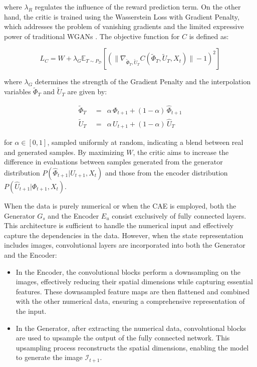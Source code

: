 where \( \lambda_R \) regulates the influence of the reward
prediction term. On the other hand, the critic is trained
using the Wasserstein Loss with Gradient Penalty,
which addresses the problem of vanishing gradients and
the limited expressive power of traditional WGANs \cite{gulrajani2017}.
The objective function for \( C \) is defined as:

\begin{equation}
L_C = W + \lambda_G \mathbb{E}_{T \sim P_{\mathcal{D}}}
\left[ (\| \nabla_{\tilde{\Phi}_T, \tilde{U}_T} C(\tilde{\Phi}_T,
\tilde{U}_T, X_t) \| - 1)^2 \right]
\end{equation}

where \( \lambda_G \) determines the strength of the Gradient Penalty
and the interpolation variables \( \tilde{\Phi}_T \) and \( \tilde{U}_T \)
are given by:

\[
    \begin{aligned}
        \tilde{\Phi}_T \;\; &=& \alpha \, \Phi_{t+1} + (1 - \alpha) \, \hat{\Phi}_{t+1} \\ 
        \tilde{U}_T \;\; &=& \alpha \, U_{t+1} + (1 - \alpha) \, \hat{U}_T
    \end{aligned}
\]

for \( \alpha \in [0, 1] \), sampled uniformly at random,
indicating a blend between real and generated samples.
By maximizing \( W \), the critic aims to increase the difference
in evaluations between samples generated from the generator distribution
\( P(\hat{\Phi}_{t+1} | U_{t+1}, X_t) \) and those from the encoder
distribution \( P(\hat{U}_{t+1} | \Phi_{t+1}, X_t) \).

When the data is purely numerical or when the
CAE is employed, both the Generator $G_s$ and the
Encoder $E_u$ consist exclusively of fully connected
layers. This architecture is sufficient to handle
the numerical input and effectively capture the dependencies
in the data. However, when the state representation
includes images, convolutional layers are incorporated
into both the Generator and the Encoder:
\begin{itemize}
    \item In the Encoder, the convolutional blocks perform a
    downsampling on the images, effectively reducing their
    spatial dimensions while capturing essential features.
    These downsampled feature maps are then flattened
    and combined with the other numerical data,
    ensuring a comprehensive representation of the input.

    \item In the Generator, after extracting the numerical data,
    convolutional blocks are used to upsample the output of
    the fully connected network. This upsampling process
    reconstructs the spatial dimensions,
    enabling the model to generate the image $\mathcal{I}_{t+1}$.
\end{itemize}

